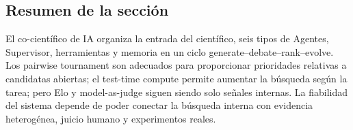 \subsection{Resumen de la sección}

El co-científico de IA organiza la entrada del científico, seis tipos de Agentes, Supervisor, herramientas y memoria en un ciclo generate--debate--rank--evolve. Los pairwise tournament son adecuados para proporcionar prioridades relativas a candidatas abiertas; el test-time compute permite aumentar la búsqueda según la tarea; pero Elo y model-as-judge siguen siendo solo señales internas. La fiabilidad del sistema depende de poder conectar la búsqueda interna con evidencia heterogénea, juicio humano y experimentos reales.


